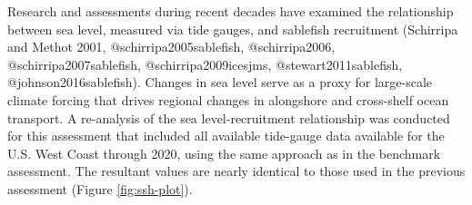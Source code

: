 \documentclass[11pt,
  english,
  a4paper,
]{article}
\begin{document}
Research and assessments during recent decades have examined the relationship between sea level, measured via tide gauges, and sablefish recruitment {(Schirripa and Methot 2001, @schirripa2005sablefish, @schirripa2006, @schirripa2007sablefish, @schirripa2009icesjms, @stewart2011sablefish, @johnson2016sablefish)\leavevmode\tagmcend\tagstructend}. Changes in sea level serve as a proxy for large-scale climate forcing that drives regional changes in alongshore and cross-shelf ocean transport. A re-analysis of the sea level-recruitment relationship was conducted for this assessment that included all available tide-gauge data available for the U.S. West Coast through 2020, using the same approach as in the benchmark assessment. The resultant values are nearly identical to those used in the previous assessment (Figure \ref{fig:ssh-plot}).

\leavevmode\tagmcend\tagstructend\par
\end{document}
